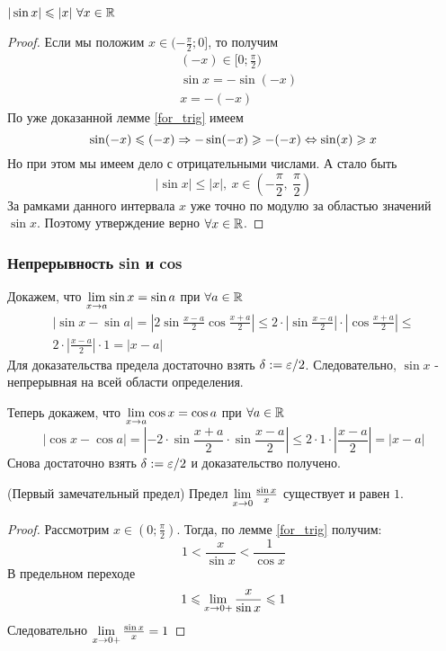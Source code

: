 \begin{corollary}
	$|\sin x| \leqslant |x|\ \forall x \in \mathbb{R}$
\end{corollary}

\begin{proof}
	Если мы положим $x \in (-\frac{\pi}{2}; 0]$, то получим
	\begin{align*}
		&(-x) \in [0; \frac{\pi}{2})
		\\
		&\sin x = -\sin (-x)
		\\
		&x = -(-x)
	\end{align*}
	По уже доказанной лемме \ref{for_trig} имеем
	\[
		\sin (-x) \leqslant (-x) \Rightarrow -\sin (-x) \geqslant -(-x) \Leftrightarrow \sin(x) \geqslant x
	\]
	Но при этом мы имеем дело с отрицательными числами. А стало быть
	\[
		|\sin x| \le |x|,\ x \in \left(-\frac{\pi}{2},\ \frac{\pi}{2}\right)
	\]
	За рамками данного интервала $x$ уже точно по модулю за областью значений $\sin x$. Поэтому утверждение верно $\forall x \in \mathbb{R}$.
\end{proof}

\subsubsection*{Непрерывность sin и cos}

Докажем, что $\lim\limits_{x \to a} \sin x = \sin a$ при $\forall a \in \mathbb{R}$
\begin{multline*}
	|\sin x - \sin a| = \left|2 \sin \frac{x - a}{2} \cos \frac{x + a}{2}\right| \le 2 \cdot \left|\sin \frac{x - a}{2}\right| \cdot \left|\cos \frac{x + a}{2}\right| \le \\
	2 \cdot \left|\frac{x - a}{2}\right| \cdot 1 = |x - a|
\end{multline*}
Для доказательства предела достаточно взять $\delta := \varepsilon / 2$. Следовательно, $\sin x$ - непрерывная на всей области определения.

Теперь докажем, что $\lim\limits_{x \to a} \cos x = \cos a$ при $\forall a \in \mathbb{R}$
\[
	|\cos x - \cos a| = \left|-2 \cdot \sin \frac{x + a}{2} \cdot \sin \frac{x - a}{2} \right| \le 2 \cdot 1 \cdot \left|\frac{x - a}{2}\right| = |x - a|
\]
Снова достаточно взять $\delta := \varepsilon / 2$ и доказательство получено.


\begin{theorem} (Первый замечательный предел) Предел $\lim\limits_{x \to 0} \frac{\sin x}{x}$ существует и равен $1$.
\end{theorem}

\begin{proof}
	Рассмотрим $x \in (0; \frac{\pi}{2})$. Тогда, по лемме \ref{for_trig} получим:
	$$
		1 < \frac{x}{\sin x} < \frac{1}{\cos x}
	$$
	В предельном переходе
	$$
		1 \leqslant \lim\limits_{x \to 0+} \frac{x}{\sin x} \leqslant 1
	$$
	Следовательно $\lim\limits_{x \to 0+} \frac{\sin x}{x} = 1$
\end{proof}

